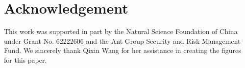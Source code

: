 \section*{Acknowledgement}
This work was supported in part by the Natural Science Foundation of China under Grant No. 62222606 and the Ant Group Security and Risk Management Fund. We sincerely thank Qixin Wang for her assistance in creating the figures for this paper.
